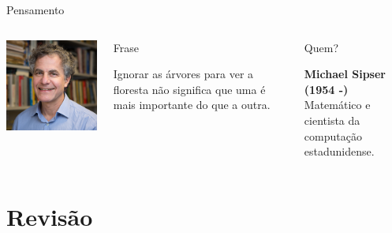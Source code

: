 \documentclass[xcolor=dvipsnames,table]{beamer}
\begin{document}
	\begin{frame}{Pensamento}
		\begin{columns}
		  		\begin{center}
		    		\includegraphics[height=.5\textheight]{images/sipser.png}
		  		\end{center}
				\begin{block}{Frase}
					\begin{center}
						{\large Ignorar as árvores para ver a floresta não significa que uma é mais importante do que a outra.}
					\end{center}
				\end{block}		  		
		  		\begin{block}{Quem?}
		  			\begin{center}
						{\bf Michael Sipser (1954 -)} \\ Matemático e cientista da computação estadunidense.
					\end{center}
				\end{block}
		\end{columns}
	\end{frame}
	

\section{Revisão}
	
\end{document}
